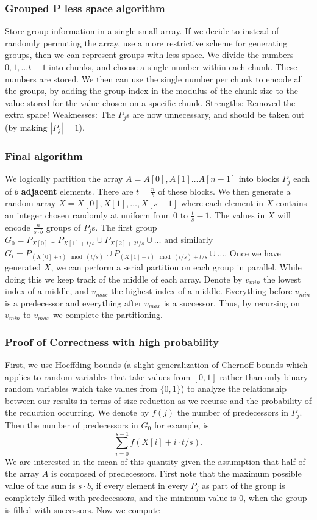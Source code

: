 \documentclass{beamer}
\begin{document}
\begin{frame}
\frametitle{Grouped P less space algorithm}
Store group information in a single small array. If we decide to instead of randomly permuting the array, use a more restrictive scheme for generating groups, then we can represent groups with less space. We divide the numbers $0,1,\hdots t-1$ into chunks, and choose a single number within each chunk. These numbers are stored. We then can use the single number per chunk to encode all the groups, by adding the group index in the modulus of the chunk size to the value stored for the value chosen on a specific chunk. Strengths: Removed the extra space! Weaknesses: The $P_j$s are now unnecessary, and should be taken out (by making $|P_j|=1$).
\end{frame}

\begin{frame}
\frametitle{Final algorithm}
We logically partition the array $A = A[0],A[1]\hdots A[n-1]$ into blocks $P_j$ each of $b$ \textbf{adjacent} elements. There are $t = \frac{n}{b}$ of these blocks. We then generate a random array $X=X[0],X[1],\hdots,X[s-1]$ where each element in $X$ contains an integer chosen randomly at uniform from $0$ to $\frac{t}{s}-1$. The values in $X$ will encode $\frac{n}{s\cdot b}$ groups of $P_j$s. The first group $G_0 = P_{X[0]} \cup P_{X[1]+t/s} \cup P_{X[2]+2t/s}\cup \hdots$ and similarly $G_i = P_{(X[0]+i) \mod (t/s)} \cup P_{(X[1]+i) \mod (t/s) + t/s} \cup \hdots.$ Once we have generated $X$, we can perform a serial partition on each group in parallel. While doing this we keep track of the middle of each array. Denote by $v_{min}$ the lowest index of a middle, and $v_{max}$ the highest index of a middle. Everything before $v_{min}$ is a predecessor and everything after $v_{max}$ is a successor. Thus, by recursing on $v_{min}$ to $v_{max}$ we complete the partitioning. 
\end{frame}

\begin{frame}
\frametitle{Proof of Correctness with high probability}
First, we use Hoeffding bounds (a slight generalization of Chernoff bounds which applies to random variables that take values from $[0,1]$ rather than only binary random variables which take values from $\{0, 1\}$) to analyze the relationship between our results in terms of size reduction as we recurse and the probability of the reduction occurring. We denote by $f(j)$ the number of predecessors in $P_j$. Then the number of predecessors in $G_0$ for example, is \\
$$\sum_{i=0}^{s-1}f(X[i]+i\cdot t/s).$$
We are interested in the mean of this quantity given the assumption that half of the array $A$ is composed of predecessors. First note that the maximum possible value of the sum is $s\cdot b$, if every element in every $P_j$ as part of the group is completely filled with predecessors, and the minimum value is $0$, when the group is filled with successors. Now we compute 
\end{frame}
\end{document}
